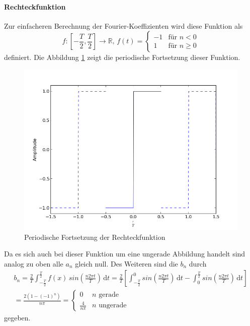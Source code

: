 \documentclass[11pt,ngerman,a4paper]{article}
\begin{document}
\paragraph{Rechteckfunktion} Zur einfacheren Berechnung der Fourier-Koeffizienten wird diese Funktion als
\begin{equation}
f \colon  \left[-\frac{T}{2}, \frac{T}{2}\right]\to \mathbb{R},\,f(t) = \begin{cases}
-1 & \mbox{f\"ur } n < 0 \\
1  & \mbox{f\"ur } n \geq 0
\end{cases}
\end{equation}
definiert. Die Abbildung \ref{org_rect} zeigt die periodische Fortsetzung dieser Funktion. 
\begin{figure}[htp]
\centering
\includegraphics[scale=0.7]{abb/Abb3.png}
\caption{Periodische Fortsetzung der Rechteckfunktion}
\label{org_rect}
\end{figure}Da es sich auch bei dieser Funktion um eine ungerade Abbildung handelt sind analog zu oben alle $a_n$ gleich null. Des Weiteren sind die $b_n$ durch
\begin{align}
b_n = \frac 2 T\int_{-\frac T 2}^\frac T 2\!f(x)\,sin\left(\frac{n2\pi t}{T}\right)\,\mathrm dt = \frac 2 T \left[ \int_{-\frac T 2}^0\!sin\left(\frac{n2\pi t}{T}\right)\,\mathrm dt - \int_0^{\frac T 2}\!sin\left(\frac{n2\pi t}{T}\right)\,\mathrm dt \right] \\
= \frac{2 (1- (-1)^n)}{n \pi} =
\begin{cases}
0 & n \mbox{ gerade}\\
\frac4{n\pi} & n \mbox{ ungerade}
\end{cases} 
\end{align}
gegeben.
\end{document}
